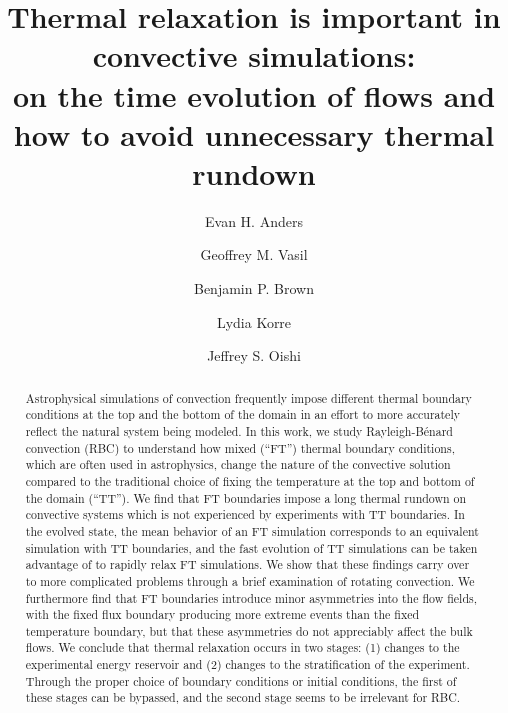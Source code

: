 \documentclass[aps, pre, onecolumn, nofootinbib, notitlepage, groupedaddress, amsfonts, amssymb, amsmath, longbibliography, superscriptaddress]{revtex4-1}
\newcommand{\RB}{Rayleigh-B\'{e}nard }
\begin{document}
\author{Evan H. Anders}
\author{Geoffrey M. Vasil}
\author{Benjamin P. Brown}
\author{Lydia Korre}
\author{Jeffrey S. Oishi}

\title{Thermal relaxation is important in convective simulations: \\
on the time evolution of flows and how to avoid unnecessary thermal rundown}

\begin{abstract}
Astrophysical simulations of convection frequently impose different thermal boundary conditions at the top and the bottom of the domain in an effort to more accurately reflect the natural system being modeled.
In this work, we study \RB convection (RBC) to understand how mixed (``FT'') thermal boundary conditions, which are often used in astrophysics, change the nature of the convective solution compared to the traditional choice of fixing the temperature at the top and bottom of the domain (``TT'').
We find that FT boundaries impose a long thermal rundown on convective systems which is not experienced by experiments with TT boundaries.
In the evolved state, the mean behavior of an FT simulation corresponds to an equivalent simulation with TT boundaries, and the fast evolution of TT simulations can be taken advantage of to rapidly relax FT simulations.
We show that these findings carry over to more complicated problems through a brief examination of rotating convection.
We furthermore find that FT boundaries introduce minor asymmetries into the flow fields, with the fixed flux boundary producing more extreme events than the fixed temperature boundary, but that these asymmetries do not appreciably affect the bulk flows.
We conclude that thermal relaxation occurs in two stages: (1) changes to the experimental energy reservoir and (2) changes to the stratification of the experiment.
Through the proper choice of boundary conditions or initial conditions, the first of these stages can be bypassed, and the second stage seems to be irrelevant for RBC.
\end{abstract}
\maketitle
\end{document}
